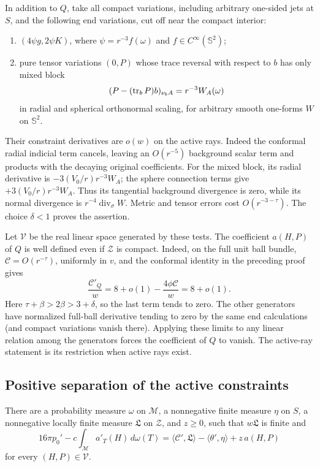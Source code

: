 In addition to \(Q\), take all compact variations, including arbitrary
one-sided jets at \(S\), and the following end variations, cut off near
the compact interior:
\begin{enumerate}
\item \((4\psi g,2\psi K)\), where
\(\psi=r^{-3}f(\omega)\) and \(f\in C^\infty(\mathbb S^2)\);
\item pure tensor variations \((0,P)\) whose trace reversal with
respect to \(b\) has only mixed block
\[
 (P-(\operatorname{tr}_bP)b)_{\nu_b A}=r^{-3}W_A(\omega)
\]
in radial and spherical orthonormal scaling, for arbitrary smooth
one-forms \(W\) on \(\mathbb S^2\).
\end{enumerate}
Their constraint derivatives are \(o(w)\) on the active rays.
Indeed the conformal radial indicial term cancels, leaving an
\(O(r^{-5})\) background scalar term and products with the decaying
original coefficients.  For the mixed block, its radial derivative
is \(-3(V_0/r)r^{-3}W_A\); the sphere connection terms give
\(+3(V_0/r)r^{-3}W_A\).  Thus its tangential background divergence is
zero, while its normal divergence is \(r^{-4}\operatorname{div}_\sigma W\).
Metric and tensor errors cost \(O(r^{-3-\tau})\).
The choice \(\delta<1\) proves the assertion.

Let \(\mathcal V\) be the real linear space generated by these tests.
The coefficient \(a(H,P)\) of \(Q\) is well defined even if
\(\mathcal Z\) is compact. Indeed, on the full unit ball bundle,
\(\mathcal C=O(r^{-\tau})\), uniformly in \(v\), and the conformal
identity in the preceding proof gives
\[
 \frac{\mathcal C'_Q}{w}
 =8+o(1)-\frac{4\phi\mathcal C}{w}=8+o(1).
\]
Here \(\tau+\beta>2\beta>3+\delta\), so the last term tends to
zero. The other generators have normalized full-ball derivative
 tending to zero by the same end calculations (and compact variations
vanish there). Applying these limits to any linear relation among
the generators forces the coefficient of \(Q\) to vanish. The
active-ray statement is its restriction when active rays exist.

\subsection{Positive separation of the active constraints}

\begin{lemma}
\label{eq-separation}
There are a probability measure \(\omega\) on \(\mathcal M\), a
nonnegative finite measure \(\eta\) on \(S\), a nonnegative locally
finite measure \(\mathfrak L\) on \(\mathcal Z\), and \(z\geq0\), such
that \(w\mathfrak L\) is finite and
\begin{equation}
 16\pi p_0'-c\int_{\mathcal M}a'_T(H)\,d\omega(T)
 =\langle\mathcal C',\mathfrak L\rangle
       -\langle\theta',\eta\rangle+z\,a(H,P)
 \label{eq-multiplier-identity}
\end{equation}
for every \((H,P)\in\mathcal V\).
\end{lemma}

